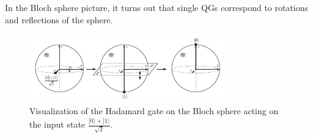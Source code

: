 \documentclass{article}
\numberwithin{equation}{section}
\newcommand{\bracket}[1]{|#1\rangle}
\begin{document}
In the Bloch sphere picture, it turns out that single QGs correspond to rotations and reflections of the sphere.

\begin{figure} \label{fig:1.4}
	\centering
	\includegraphics[width=0.75\textwidth]{hadamard_bloch_sphere.png}
	\caption{Visualization of the Hadamard gate on the Bloch sphere acting on the input state $\frac{\bracket{0} + \bracket{1}}{\sqrt{2}}$.}
\end{figure}
\end{document}
